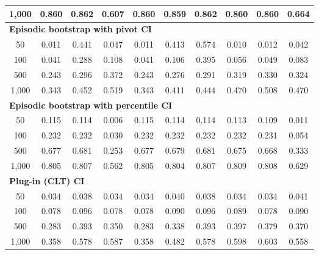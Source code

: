 \documentclass{article}
\numberwithin{equation}{section}
\begin{document}
\begin{table}[ht]
\begin{tabular}{c|ccc|cccccc}
1{,}000
& \cellcolor{covheat!80!white}0.860 & \cellcolor{covheat!81!white}0.862 & 0.607
& \cellcolor{covheat!80!white}0.860 & \cellcolor{covheat!80!white}0.859 & \cellcolor{covheat!81!white}0.862 & \cellcolor{covheat!80!white}0.860 & \cellcolor{covheat!80!white}0.860 & 0.664 \\
\hline
\multicolumn{10}{l}{\textbf{Episodic bootstrap with pivot CI}} \\ \hline
50
& 0.011 & 0.441 & 0.047
& 0.011 & 0.413 & 0.574 & 0.010 & 0.012 & 0.042 \\
100
& 0.041 & 0.288 & 0.108
& 0.041 & 0.106 & 0.395 & 0.056 & 0.049 & 0.083 \\
500
& 0.243 & 0.296 & 0.372
& 0.243 & 0.276 & 0.291 & 0.319 & 0.330 & 0.324 \\
1{,}000
& 0.343 & 0.452 & 0.519
& 0.343 & 0.411 & 0.444 & 0.470 & 0.508 & 0.470 \\
\hline
\multicolumn{10}{l}{\textbf{Episodic bootstrap with percentile CI}} \\ \hline
50
& 0.115 & 0.114 & 0.006
& 0.115 & 0.114 & 0.114 & 0.113 & 0.109 & 0.011 \\
100
& 0.232 & 0.232 & 0.030
& 0.232 & 0.232 & 0.232 & 0.232 & 0.231 & 0.054 \\
500
& 0.677 & 0.681 & 0.253
& 0.677 & 0.679 & 0.681 & 0.675 & 0.668 & 0.333 \\
1{,}000
& \cellcolor{covheat!53!white}0.805 & \cellcolor{covheat!54!white}0.807 & 0.562
& \cellcolor{covheat!53!white}0.805 & \cellcolor{covheat!52!white}0.804 & \cellcolor{covheat!54!white}0.807 & \cellcolor{covheat!55!white}0.809 & \cellcolor{covheat!54!white}0.808 & 0.629 \\
\hline
\multicolumn{10}{l}{\textbf{Plug-in (CLT) CI}} \\ \hline
50
& 0.034 & 0.038 & 0.034
& 0.034 & 0.040 & 0.038 & 0.034 & 0.034 & 0.041 \\
100
& 0.078 & 0.096 & 0.078
& 0.078 & 0.090 & 0.096 & 0.089 & 0.078 & 0.090 \\
500
& 0.283 & 0.393 & 0.350
& 0.283 & 0.338 & 0.393 & 0.397 & 0.379 & 0.370 \\
1{,}000
& 0.358 & 0.578 & 0.587
& 0.358 & 0.482 & 0.578 & 0.598 & 0.603 & 0.558 \\
\hline
\end{tabular}
\end{table}
\end{document}
